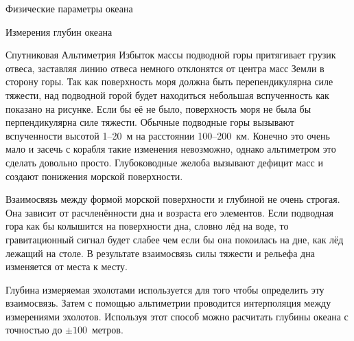 \begin{chapter}{Физические параметры океана}
\begin{section}{Измерения глубин океана}
\begin{subsection}{Спутниковая Альтиметрия}
Избыток массы подводной горы притягивает грузик отвеса, заставляя
линию отвеса немного отклонятся от центра масс Земли в сторону
горы. Так как поверхность моря должна быть перепендикулярна силе
тяжести, над подводной горой будет находиться небольшая вспученность
как показано на рисунке. Если бы её не было, поверхность моря не была
бы перпендикулярна силе тяжести. Обычные подводные горы вызывают
вспученности высотой 1--20~м на расстоянии 100--200~км. Конечно это
очень мало и засечь с корабля такие изменения невозможно, однако
альтиметром это сделать довольно просто. Глубоководные желоба вызывают
дефицит масс и создают понижения морской поверхности.
%

Взаимосвязь между формой морской поверхности и глубиной не очень
строгая. Она зависит от расчленённости дна и возраста его
элементов. Если подводная гора как бы колышится на поверхности дна,
словно лёд на воде, то гравитационный сигнал будет слабее чем если бы
она покоилась на дне, как лёд лежащий на столе. В результате
взаимосвязь силы тяжести и рельефа дна изменяется от места к месту.
%

Глубина измеряемая эхолотами используется для того чтобы определить
эту взаимосвязь. Затем с помощью альтиметрии проводится интерполяция
между измерениями эхолотов. Используя этот способ можно расчитать
глубины океана с точностью до $\pm 100$~метров.
%



\end{subsection}
\end{section}
\end{chapter}
